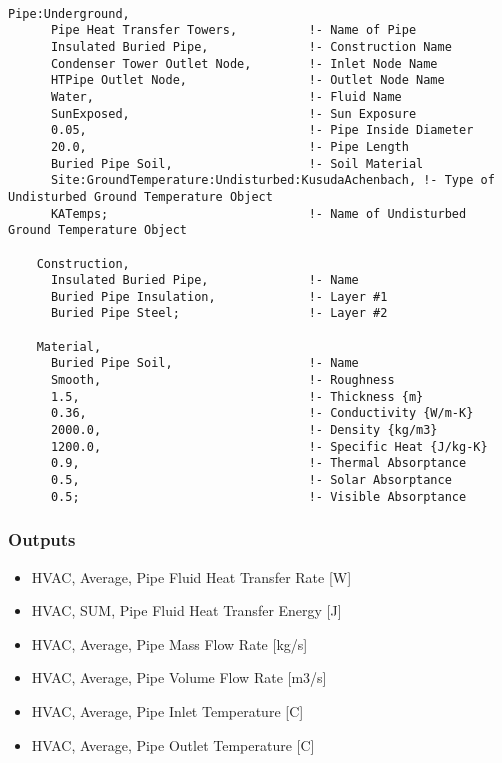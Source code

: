 \begin{lstlisting}

Pipe:Underground,
      Pipe Heat Transfer Towers,          !- Name of Pipe
      Insulated Buried Pipe,              !- Construction Name
      Condenser Tower Outlet Node,        !- Inlet Node Name
      HTPipe Outlet Node,                 !- Outlet Node Name
      Water,                              !- Fluid Name
      SunExposed,                         !- Sun Exposure
      0.05,                               !- Pipe Inside Diameter
      20.0,                               !- Pipe Length
      Buried Pipe Soil,                   !- Soil Material
      Site:GroundTemperature:Undisturbed:KusudaAchenbach, !- Type of Undisturbed Ground Temperature Object
      KATemps;                            !- Name of Undisturbed Ground Temperature Object

    Construction,
      Insulated Buried Pipe,              !- Name
      Buried Pipe Insulation,             !- Layer #1
      Buried Pipe Steel;                  !- Layer #2

    Material,
      Buried Pipe Soil,                   !- Name
      Smooth,                             !- Roughness
      1.5,                                !- Thickness {m}
      0.36,                               !- Conductivity {W/m-K}
      2000.0,                             !- Density {kg/m3}
      1200.0,                             !- Specific Heat {J/kg-K}
      0.9,                                !- Thermal Absorptance
      0.5,                                !- Solar Absorptance
      0.5;                                !- Visible Absorptance
\end{lstlisting}

\subsubsection{Outputs}\label{outputs-8-004}

\begin{itemize}
\item
  HVAC, Average, Pipe Fluid Heat Transfer Rate {[}W{]}
\item
  HVAC, SUM, Pipe Fluid Heat Transfer Energy {[}J{]}
\item
  HVAC, Average, Pipe Mass Flow Rate {[}kg/s{]}
\item
  HVAC, Average, Pipe Volume Flow Rate {[}m3/s{]}
\item
  HVAC, Average, Pipe Inlet Temperature {[}C{]}
\item
  HVAC, Average, Pipe Outlet Temperature {[}C{]}
\end{itemize}

